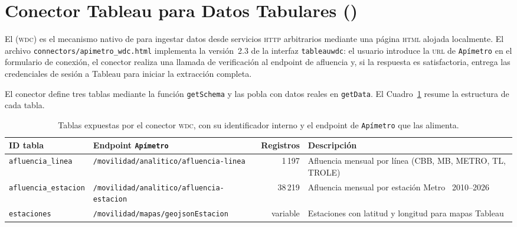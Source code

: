 
\section{Conector Tableau para Datos Tabulares ()}
\label{anx:tg-wdc}

El  (\textsc{wdc}) es el mecanismo nativo de
 para ingestar datos desde servicios \textsc{http}
arbitrarios mediante una página \textsc{html} alojada localmente. El archivo
\texttt{connectors/apimetro\_wdc.html} implementa la versión~2.3 de la interfaz
\texttt{tableauwdc}: el usuario introduce la \textsc{url} de \texttt{Apímetro}
en el formulario de conexión, el conector realiza una llamada de verificación al
endpoint de afluencia y, si la respuesta es satisfactoria, entrega las
credenciales de sesión a Tableau para iniciar la extracción completa.

El conector define tres tablas mediante la función \texttt{getSchema} y las
pobla con datos reales en \texttt{getData}. El Cuadro~\ref{tab:tg-wdc-tablas}
resume la estructura de cada tabla.

\begin{table}[htbp]
    \centering
    \footnotesize
    \caption[Tablas del  de \texttt{Apímetro} para Tableau]{Tablas
    expuestas por el conector \textsc{wdc}, con su identificador interno
    y el endpoint de \texttt{Apímetro} que las alimenta.}
    \label{tab:tg-wdc-tablas}
    \begin{tabularx}{\textwidth}{|l|>{\raggedright\arraybackslash}X|r|>{\raggedright\arraybackslash}p{4.6cm}|}
        \hline
        \textbf{ID tabla} & \textbf{Endpoint \texttt{Apímetro}} & \textbf{Registros} & \textbf{Descripción} \\
        \hline
        \texttt{afluencia\_linea}    & \nolinkurl{/movilidad/analitico/afluencia-linea}    & 1\,197  & Afluencia mensual por línea (CBB, MB, METRO, TL, TROLE) \\
        \texttt{afluencia\_estacion} & \nolinkurl{/movilidad/analitico/afluencia-estacion} & 38\,219 & Afluencia mensual por estación Metro~\cdmx{} 2010--2026 \\
        \texttt{estaciones}          & \nolinkurl{/movilidad/mapas/geojsonEstacion}        & variable & Estaciones con latitud y longitud para mapas Tableau \\
        \hline
    \end{tabularx}
\end{table}

